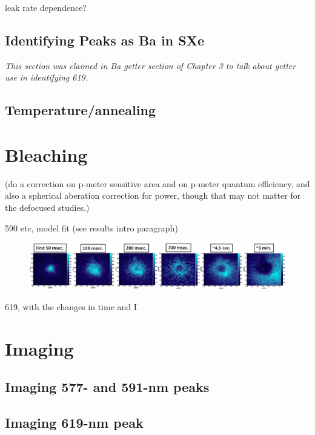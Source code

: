 leak rate dependence?

\subsection{Identifying Peaks as Ba in SXe}
\label{subsec:peakIdentify}

\emph{\color{gray}This section was claimed in Ba getter section of Chapter 3 to talk about getter use in identifying 619.}

\subsection{Temperature/annealing}

\section{Bleaching}
\label{sec:bleaching}

({\color{red}do a correction on p-meter sensitive area and on p-meter quantum efficiency, and also a spherical aberation correction for power, though that may not matter for the defocused studies.})

590 etc, model fit (see results intro paragraph)

\begin{figure} %
        \centering
                \includegraphics[width=.9\textwidth]{figures/hole_bleach_590.png}
                \caption{}
\label{fig:testfig}
\end{figure}

619, with the changes in time and I

\section{Imaging}
\label{imaging}

\subsection{Imaging 577- and 591-nm peaks}

\subsection{Imaging 619-nm peak}

